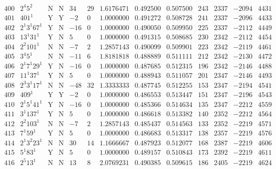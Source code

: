 \documentclass[11pt,reqno,a4letter]{article}
\numberwithin{equation}{section}
\numberwithin{figure}{section}
\numberwithin{table}{section}
\theoremstyle{plain}
\numberwithin{theorem}{section}
\theoremstyle{definition}
\begin{document}
\begin{table}[ht]
\begin{equation*}
{\begin{array}{cc|cc|ccc|cc|cccc}
 400 & 2^4 5^2 & \text{N} & \text{N} & 34 & 29 & 1.6176471 & 0.492500 & 0.507500 & 243 & 2337 & -2094 & 4431 \\
 401 & 401^1 & \text{Y} & \text{Y} & -2 & 0 & 1.0000000 & 0.491272 & 0.508728 & 241 & 2337 & -2096 & 4433 \\
 402 & 2^1 3^1 67^1 & \text{Y} & \text{N} & -16 & 0 & 1.0000000 & 0.490050 & 0.509950 & 225 & 2337 & -2112 & 4449 \\
 403 & 13^1 31^1 & \text{Y} & \text{N} & 5 & 0 & 1.0000000 & 0.491315 & 0.508685 & 230 & 2342 & -2112 & 4454 \\
 404 & 2^2 101^1 & \text{N} & \text{N} & -7 & 2 & 1.2857143 & 0.490099 & 0.509901 & 223 & 2342 & -2119 & 4461 \\
 405 & 3^4 5^1 & \text{N} & \text{N} & -11 & 6 & 1.8181818 & 0.488889 & 0.511111 & 212 & 2342 & -2130 & 4472 \\
 406 & 2^1 7^1 29^1 & \text{Y} & \text{N} & -16 & 0 & 1.0000000 & 0.487685 & 0.512315 & 196 & 2342 & -2146 & 4488 \\
 407 & 11^1 37^1 & \text{Y} & \text{N} & 5 & 0 & 1.0000000 & 0.488943 & 0.511057 & 201 & 2347 & -2146 & 4493 \\
 408 & 2^3 3^1 17^1 & \text{N} & \text{N} & -48 & 32 & 1.3333333 & 0.487745 & 0.512255 & 153 & 2347 & -2194 & 4541 \\
 409 & 409^1 & \text{Y} & \text{Y} & -2 & 0 & 1.0000000 & 0.486553 & 0.513447 & 151 & 2347 & -2196 & 4543 \\
 410 & 2^1 5^1 41^1 & \text{Y} & \text{N} & -16 & 0 & 1.0000000 & 0.485366 & 0.514634 & 135 & 2347 & -2212 & 4559 \\
 411 & 3^1 137^1 & \text{Y} & \text{N} & 5 & 0 & 1.0000000 & 0.486618 & 0.513382 & 140 & 2352 & -2212 & 4564 \\
 412 & 2^2 103^1 & \text{N} & \text{N} & -7 & 2 & 1.2857143 & 0.485437 & 0.514563 & 133 & 2352 & -2219 & 4571 \\
 413 & 7^1 59^1 & \text{Y} & \text{N} & 5 & 0 & 1.0000000 & 0.486683 & 0.513317 & 138 & 2357 & -2219 & 4576 \\
 414 & 2^1 3^2 23^1 & \text{N} & \text{N} & 30 & 14 & 1.1666667 & 0.487923 & 0.512077 & 168 & 2387 & -2219 & 4606 \\
 415 & 5^1 83^1 & \text{Y} & \text{N} & 5 & 0 & 1.0000000 & 0.489157 & 0.510843 & 173 & 2392 & -2219 & 4611 \\
 416 & 2^5 13^1 & \text{N} & \text{N} & 13 & 8 & 2.0769231 & 0.490385 & 0.509615 & 186 & 2405 & -2219 & 4624 \\

\end{array}}
\end{equation*}
\end{table}
\end{document}
